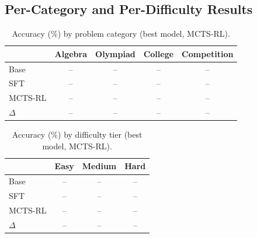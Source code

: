 \documentclass[11pt,a4paper]{article}
\begin{document}
%
%
%
%

\subsection{Per-Category and Per-Difficulty Results}

\begin{table}[h]
\centering
\caption{Accuracy (\%) by problem category (best model, MCTS-RL).}
\label{tab:category}
\begin{tabular}{lcccc}
\toprule
 & Algebra & Olympiad & College & Competition \\
\midrule
Base     & -- & -- & -- & -- \\
SFT      & -- & -- & -- & -- \\
MCTS-RL  & -- & -- & -- & -- \\
\midrule
$\Delta$ & -- & -- & -- & -- \\
\bottomrule
\end{tabular}
\end{table}

\begin{table}[h]
\centering
\caption{Accuracy (\%) by difficulty tier (best model, MCTS-RL).}
\label{tab:difficulty}
\begin{tabular}{lccc}
\toprule
 & Easy & Medium & Hard \\
\midrule
Base     & -- & -- & -- \\
SFT      & -- & -- & -- \\
MCTS-RL  & -- & -- & -- \\
\midrule
$\Delta$ & -- & -- & -- \\
\bottomrule
\end{tabular}
\end{table}

\end{document}
